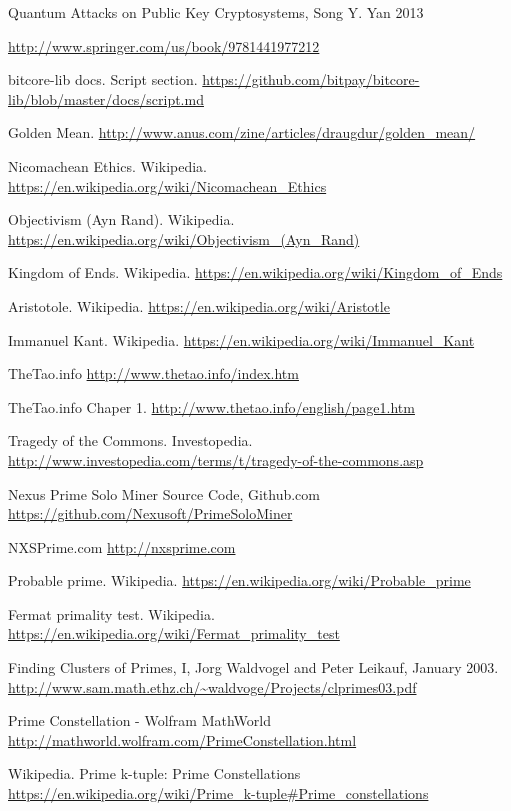 \documentclass[11pt]{article}
\begin{document}
\begin{thebibliography}{7}
Quantum Attacks on Public Key Cryptosystems, Song Y. Yan 2013

\url{http://www.springer.com/us/book/9781441977212}

bitcore-lib docs. Script section.
\url{https://github.com/bitpay/bitcore-lib/blob/master/docs/script.md}

Golden Mean.
\url{http://www.anus.com/zine/articles/draugdur/golden_mean/}

Nicomachean Ethics. Wikipedia.
\url{https://en.wikipedia.org/wiki/Nicomachean_Ethics}

Objectivism (Ayn Rand). Wikipedia.
\url{https://en.wikipedia.org/wiki/Objectivism_(Ayn_Rand)}

Kingdom of Ends. Wikipedia.
\url{https://en.wikipedia.org/wiki/Kingdom_of_Ends}

Aristotole. Wikipedia.
\url{https://en.wikipedia.org/wiki/Aristotle}

Immanuel Kant. Wikipedia.
\url{https://en.wikipedia.org/wiki/Immanuel_Kant}

TheTao.info
\url{http://www.thetao.info/index.htm}

TheTao.info Chaper 1.
\url{http://www.thetao.info/english/page1.htm}

Tragedy of the Commons. Investopedia.
\url{http://www.investopedia.com/terms/t/tragedy-of-the-commons.asp}

Nexus Prime Solo Miner Source Code, Github.com
\url{https://github.com/Nexusoft/PrimeSoloMiner}

NXSPrime.com
\url{http://nxsprime.com}

Probable prime. Wikipedia.
\url{https://en.wikipedia.org/wiki/Probable_prime}

Fermat primality test. Wikipedia.
\url{https://en.wikipedia.org/wiki/Fermat_primality_test}

Finding Clusters of Primes, I, Jorg Waldvogel and Peter Leikauf, January 2003.
\url{http://www.sam.math.ethz.ch/~waldvoge/Projects/clprimes03.pdf}

Prime Constellation - Wolfram MathWorld
\url{http://mathworld.wolfram.com/PrimeConstellation.html}

Wikipedia. Prime k-tuple: Prime Constellations
\url{https://en.wikipedia.org/wiki/Prime_k-tuple#Prime_constellations}


\end{thebibliography}
\end{document}
